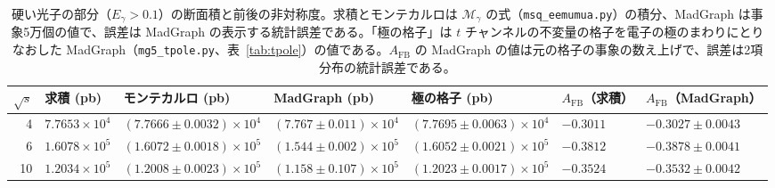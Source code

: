 \documentclass[a4paper,10pt]{ltjsarticle}
\begin{document}
\begin{table}[tbp]
\centering\small
\caption{硬い光子の部分（$E_\gamma>0.1$）の断面積と前後の非対称度。求積とモンテカルロは $\mathcal M_\gamma$ の式（\texttt{msq\_eemumua.py}）の積分、MadGraph は事象5万個の値で、誤差は MadGraph の表示する統計誤差である。「極の格子」は $t$ チャンネルの不変量の格子を電子の極のまわりにとりなおした MadGraph（\texttt{mg5\_tpole.py}、表~\ref{tab:tpole}）の値である。$A_{\mathrm{FB}}$ の MadGraph の値は元の格子の事象の数え上げで、誤差は2項分布の統計誤差である。}
\label{tab:hardmg}
\footnotesize\setlength{\tabcolsep}{3.5pt}
\begin{tabular}{rllllll}
\toprule
$\sqrt s$ & 求積 (pb) & モンテカルロ (pb) & MadGraph (pb) & 極の格子 (pb) & $A_{\mathrm{FB}}$（求積） & $A_{\mathrm{FB}}$（MadGraph） \\
\midrule
4 & $7.7653\times10^{4}$ & $(7.7666\pm0.0032)\times10^{4}$ & $(7.767\pm0.011)\times10^{4}$ & $(7.7695\pm0.0063)\times10^{4}$ & $-0.3011$ & $-0.3027\pm0.0043$ \\
6 & $1.6078\times10^{5}$ & $(1.6072\pm0.0018)\times10^{5}$ & $(1.544\pm0.002)\times10^{5}$ & $(1.6052\pm0.0021)\times10^{5}$ & $-0.3812$ & $-0.3878\pm0.0041$ \\
10 & $1.2034\times10^{5}$ & $(1.2008\pm0.0023)\times10^{5}$ & $(1.158\pm0.107)\times10^{5}$ & $(1.2023\pm0.0017)\times10^{5}$ & $-0.3524$ & $-0.3532\pm0.0042$ \\
\bottomrule
\end{tabular}
\end{table}
\end{document}
